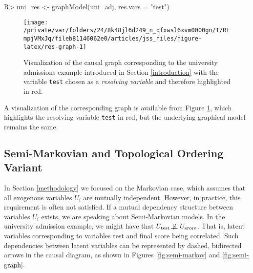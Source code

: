 \documentclass[
  nojss]{jss}
\begin{document}
\begin{CodeChunk}
\begin{CodeInput}
R> uni_res <- graphModel(uni_adj, res.vars = "test")
\end{CodeInput}
\end{CodeChunk}

\begin{CodeChunk}
\begin{figure}

{\centering \texttt{[image: /private/var/folders/24/8k48jl6d249\_n\_qfxwsl6xvm0000gn/T/RtmpjVMxJq/fileb81146062e0/articles/jss\_files/figure-latex/res-graph-1]} 

}

\caption[Visualization of the causal graph corresponding to the university admissions example introduced in Section \ref{introduction} with the variable \texttt{test} chosen as a \textit{resolving variable} and therefore highlighted in red]{Visualization of the causal graph corresponding to the university admissions example introduced in Section \ref{introduction} with the variable \texttt{test} chosen as a \textit{resolving variable} and therefore highlighted in red.}\label{fig:res-graph}
\end{figure}
\end{CodeChunk}

A visualization of the corresponding graph is available from Figure
\ref{fig:res-graph}, which highlights the resolving variable
\texttt{test} in red, but the underlying graphical model remains the
same.

\hypertarget{semi-markovian-and-topological-ordering-variant}{%
\subsection{Semi-Markovian and Topological Ordering
Variant}\label{semi-markovian-and-topological-ordering-variant}}

In Section \ref{methodology} we focused on the Markovian case, which
assumes that all exogenous variables \(U_i\) are mutually independent.
However, in practice, this requirement is often not satisfied. If a
mutual dependency structure between variables \(U_i\) exists, we are
speaking about Semi-Markovian models. In the university admission
example, we might have that
\(U_{\text{test}} \not\!\perp\!\!\!\perp U_{\text{score}}\). That is,
latent variables corresponding to variables test and final score being
correlated. Such dependencies between latent variables can be
represented by dashed, bidirected arrows in the causal diagram, as shown
in Figures \ref{fig:semi-markov} and \ref{fig:semi-graph}.
\end{document}
